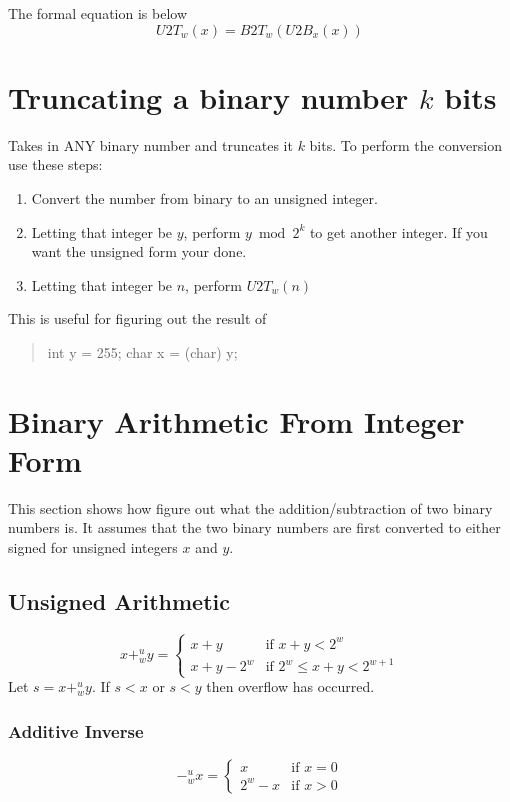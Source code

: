 \documentclass[12pt]{article}
\begin{document}
The formal equation is below
\begin{equation}
U2T_w(x)=B2T_w(U2B_x(x))
\end{equation}

\section{Truncating a binary number $k$ bits}
Takes in ANY binary number and truncates it $k$ bits. To perform the conversion use these steps:
\begin{enumerate}
\item Convert the number from binary to an unsigned integer. 
\item Letting that integer be $y$, perform $y \bmod 2^k$ to get another integer. If you want the unsigned form your done.
\item Letting that integer be $n$, perform $U2T_w(n)$
\end{enumerate}
This is useful for figuring out the result of
\begin{verse}
int y = 255;
char x = (char) y;
\end{verse}

\section{Binary Arithmetic From Integer Form}
This section shows how figure out what the addition/subtraction of two binary numbers is. It assumes that the two binary numbers are first converted to either signed for unsigned integers $x$ and $y$.
\subsection{Unsigned Arithmetic}
\begin{equation}
x+_w^u y = \begin{cases}
x+y & \text{if } x + y < 2^w \\
x+y-2^w & \text{if } 2^w \leq x+y < 2^{w+1}
\end{cases}
\end{equation}
Let $s=x+_w^u y$. If $s<x$ or $s<y$ then overflow has occurred.

\subsubsection{Additive Inverse}
\begin{equation}
-_w^u x = \begin{cases}
x & \text{if } x=0\\
2^w-x & \text{if } x>0
\end{cases}
\end{equation}
\end{document}
